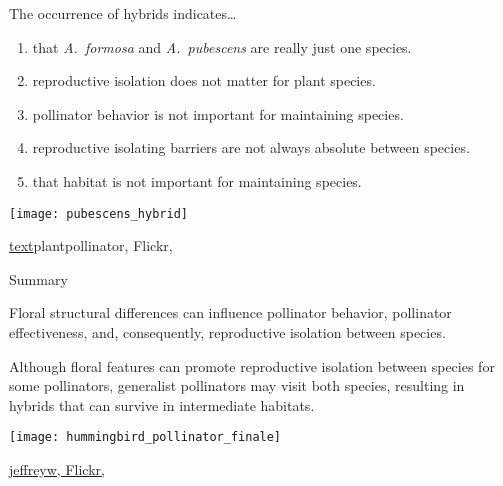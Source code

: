 \documentclass[t,hidelinks]{beamer}
\newcommand{\ques}[1]{\highlight{\textsc{q#1:}}}
\begin{document}
%
\begin{frame}[t]{\ques{16} The occurrence of hybrids indicates\dots}
	
	\begin{multicols}{2}
	\begin{enumerate}
		\item that \textit{A.~formosa} and \textit{A.~pubescens} are really just one species.
		\item reproductive isolation does not matter for plant species.
		\item pollinator behavior is not important for maintaining species.
		\item reproductive isolating barriers are not always absolute between species.
		\item that habitat is not important for maintaining species.
	\end{enumerate}
	
	\columnbreak
	
		\texttt{[image: pubescens\_hybrid]}
	\end{multicols}
	
	\vfilll
	
	\hfill \tiny \href{https://www.flickr.com/photos/63093099@N02/32184751505/in/photolist-R34gjH}{text}plantpollinator, Flickr, 
\end{frame}
%
\begin{frame}[t]{Summary}
	
	\begin{multicols}{2}
	\hangpara Floral structural differences can influence pollinator behavior, pollinator effectiveness, and, consequently, reproductive isolation between species. 

	\hangpara Although floral features can promote reproductive isolation between species for some pollinators, generalist pollinators may visit both species, resulting in hybrids that can survive in intermediate habitats. 

	\columnbreak
	
		\texttt{[image: hummingbird\_pollinator\_finale]}
	\end{multicols}

	\vfilll
	
	\hfill \tiny \href{https://www.flickr.com/photos/jeffreyww/17421811000/in/photolist-egCnAb-W5cqTb-JmQo5J-NYPC2-7Tve9a-aCd9bM-7YoLY2-eeKix9-dhnGmv-nh85vv-sAP76s-6PkrUP-6r6qhK-driKBF-drdFtw-WS8wEY-drdwbv-7Ys1Pu-7YoLMx-egwBPz-9L5NHb-sqRuEw-sUo69r-9L5NHU-f9MG8d-RUtzU5-sxvkrJ-exZVce-sUcJns-rSeypr-oim7rn-drdzeb}{jeffreyw, Flickr, }
\end{frame}
%
\end{document}
